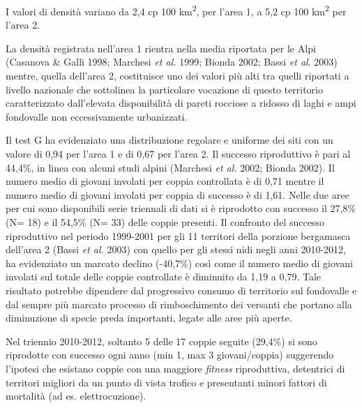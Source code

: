 I valori di densit\`a variano da 2,4 cp 100 km\textsuperscript{{}2},
per l{\textquoteright}area 1, a 5,2 cp 100 km\textsuperscript{{}2} per
l{\textquoteright}area 2. 

La densit\`a registrata nell{\textquoteright}area 1 rientra nella media
riportata per le Alpi (Casanova \& Galli 1998; Marchesi \textit{et al.
}1999; Bionda 2002; Bassi \textit{et al}. 2003) mentre, quella
dell{\textquoteright}area 2, costituisce uno dei valori pi\`u alti tra
quelli riportati a livello nazionale che sottolinea la particolare
vocazione di questo territorio caratterizzato
dall{\textquoteright}elevata disponibilit\`a di pareti rocciose a
ridosso di laghi e ampi fondovalle non eccessivamente urbanizzati.

Il test G ha evidenziato una distribuzione regolare e uniforme dei siti
con un valore di 0,94 per l{\textquoteright}area 1 e di 0,67 per
l{\textquoteright}area 2. Il successo riproduttivo \`e pari al 44,4\%,
in linea con alcuni studi alpini (Marchesi \textit{et al. }2002; Bionda
2002). Il numero medio di giovani involati per coppia controllata \`e
di 0,71 mentre il numero medio di giovani involati per coppia di
successo \`e di 1,61. Nelle due aree per cui sono disponibili serie
triennali di dati si \`e riprodotto con successo il 27,8\% (N= 18) e il
54,5\% (N= 33) delle coppie presenti. Il confronto del successo
riproduttivo nel periodo 1999-2001 per gli 11 territori della porzione
bergamasca dell{\textquoteright}area 2 (Bassi \textit{et al. }2003) con
quello per gli stessi nidi negli anni 2010-2012, ha evidenziato un
marcato declino (-40,7\%) cos\`i come il numero medio di giovani
involati sul totale delle coppie controllate \`e diminuito da 1,19 a
0,79. Tale risultato potrebbe dipendere dal progressivo consumo di
territorio sul fondovalle e dal sempre pi\`u marcato processo di
rimboschimento dei versanti che portano alla diminuzione di specie
preda importanti, legate alle aree pi\`u aperte.

Nel triennio 2010-2012, soltanto 5 delle 17 coppie seguite (29,4\%) si
sono riprodotte con successo ogni anno (min 1, max 3 giovani/coppia)
suggerendo l{\textquoteright}ipotesi che esistano coppie con una
maggiore \textit{fitness} riproduttiva, detentrici di territori
migliori da un punto di vista trofico e presentanti minori fattori di
mortalit\`a (ad es. elettrocuzione).

